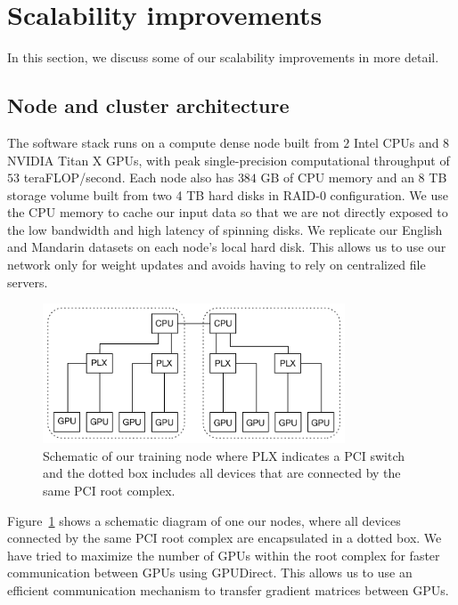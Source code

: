 \documentclass{article}
\begin{document}
{\small


}

\appendix
\section{Scalability improvements}
In this section, we discuss some of our scalability improvements in more detail.

\subsection{Node and cluster architecture}
The software stack runs on a compute dense node built from $2$ Intel CPUs and $8$ NVIDIA Titan X GPUs, with peak single-precision computational throughput of $53$ teraFLOP/second. Each node also has $384$ GB of CPU memory and an $8$ TB storage volume built from two 4 TB hard disks in RAID-0 configuration. We use the CPU memory to cache our input data so that we are not directly exposed to the low bandwidth and high latency of spinning disks. We replicate our English and Mandarin datasets on each node's local hard disk. This allows us to use our network only for weight updates and avoids having to rely on centralized file servers.

\begin{figure}[h]
    \centering
    \includegraphics[width=0.8\textwidth]{Node_Arch.pdf}
    \caption{Schematic of our training node where PLX indicates a PCI switch and the dotted box includes all devices that are connected by the same PCI root complex.}
    \label{fig:node-arch}
\end{figure}

Figure~\ref{fig:node-arch} shows a schematic diagram of one our nodes, where all devices connected by the same PCI root complex are encapsulated in a dotted box. We have tried to maximize the number of GPUs within the root complex for faster communication between GPUs using GPUDirect. This allows us to use an efficient communication mechanism to transfer gradient matrices between GPUs. 
\end{document}

